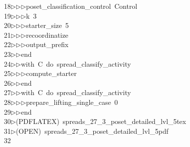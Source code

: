 \begin{tabbing}
18\>$\triangleright$\>$\triangleright$\>$\triangleright$\>poset\_classification\_control\ Control\ \\[0pt]
19\>$\triangleright$\>$\triangleright$\>$\triangleright$\>k\ 3\ \\[0pt]
20\>$\triangleright$\>$\triangleright$\>$\triangleright$\>starter\_size\ 5\ \\[0pt]
21\>$\triangleright$\>$\triangleright$\>$\triangleright$\>recoordinatize\ \\[0pt]
22\>$\triangleright$\>$\triangleright$\>$\triangleright$\>output\_prefix\ \ \\[0pt]
23\>$\triangleright$\>$\triangleright$\>end\ \\[0pt]
24\>$\triangleright$\>$\triangleright$\>with\ C\ do\ spread\_classify\_activity\ \\[0pt]
25\>$\triangleright$\>$\triangleright$\>$\triangleright$\>compute\_starter\ \\[0pt]
26\>$\triangleright$\>$\triangleright$\>end\ \\[0pt]
27\>$\triangleright$\>$\triangleright$\>with\ C\ do\ spread\_classify\_activity\ \\[0pt]
28\>$\triangleright$\>$\triangleright$\>$\triangleright$\>prepare\_lifting\_single\_case\ 0\ \\[0pt]
29\>$\triangleright$\>$\triangleright$\>end\\[0pt]
30\>$\triangleright$\>(PDFLATEX)\ spreads\_27\_3\_poset\_detailed\_lvl\_5tex\\[0pt]
31\>$\triangleright$\>(OPEN)\ spreads\_27\_3\_poset\_detailed\_lvl\_5pdf\\[0pt]
32\>\end{tabbing}
